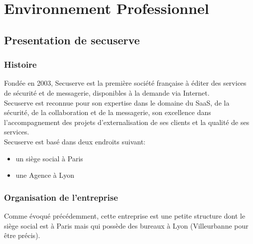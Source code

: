 \section{Environnement Professionnel }
\subsection{Presentation de secuserve}
\subsubsection{Histoire}
Fondée en 2003, Secuserve est la première société française à éditer des services de sécurité et de messagerie, disponibles à la demande via Internet.\\
Secuserve est reconnue pour son expertise dans le domaine du SaaS, de la sécurité, de la collaboration et de la messagerie, son excellence dans l’accompagnement des projets d’externalisation de ses clients et la qualité de ses services.\\
Secuserve est basé dans deux endroits suivant: 
\begin{itemize}
\item un siège social à Paris 
\item une Agence à Lyon
\end{itemize}

\subsubsection{Organisation de l'entreprise}
Comme évoqué précédemment, cette entreprise est une petite structure dont le siège social est à Paris mais qui possède des bureaux à Lyon (Villeurbanne pour être précis).

